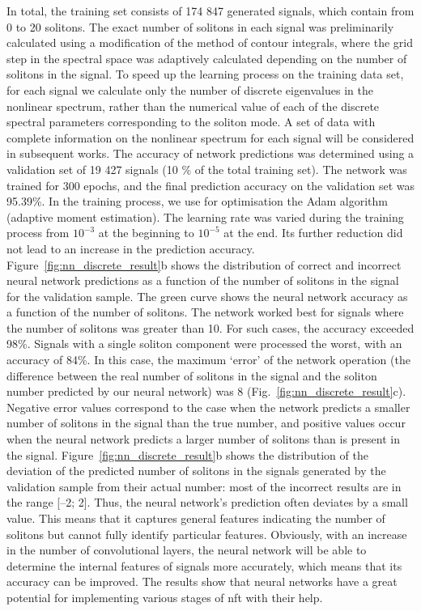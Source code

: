 In total, the training set consists of 174 847 generated signals, which contain from 0 to 20 solitons. The exact number
of solitons in each signal was preliminarily calculated using
a modification of the method of contour integrals,
where the grid step in the spectral space was adaptively calculated depending on the number of solitons in the signal.
To speed up the learning process on the training data set, for
each signal we calculate only the number of discrete eigenvalues in the nonlinear spectrum, rather than the numerical
value of each of the discrete spectral parameters corresponding to the soliton mode. A set of data with complete information on the nonlinear spectrum for each signal will be
considered in subsequent works. The accuracy of network
predictions was determined using a validation set of
19 427 signals (10 \% of the total training set). The network
was trained for 300 epochs, and the final prediction accuracy
on the validation set was 95.39\%. In the training process, we
use for optimisation the Adam algorithm (adaptive moment
estimation). The learning rate was varied during the training
process from $10^{-3}$ at the beginning to $10^{-5}$ at the end. 
Its further reduction did not lead to an increase in the prediction
accuracy.
Figure~\ref{fig:nn_discrete_result}b shows the distribution of correct and incorrect
neural network predictions as a function of the number of
solitons in the signal for the validation sample. The green
curve shows the neural network accuracy as a function of the
number of solitons. The network worked best for signals
where the number of solitons was greater than 10. For such
cases, the accuracy exceeded 98\%. Signals with a single soliton component were processed the worst, with an accuracy of
84\%. In this case, the maximum ‘error’ of the network operation (the difference between the real number of solitons in the
signal and the soliton number predicted by our neural network) was 8 (Fig.~\ref{fig:nn_discrete_result}c). Negative error values correspond to the
case when the network predicts a smaller number of solitons
in the signal than the true number, and positive values occur
when the neural network predicts a larger number of solitons
than is present in the signal. Figure~\ref{fig:nn_discrete_result}b shows the distribution
of the deviation of the predicted number of solitons in the
signals generated by the validation sample from their actual
number: most of the incorrect results are in the range [–2; 2].
Thus, the neural network’s prediction often deviates by a
small value. This means that it captures general features indicating the number of solitons but cannot fully identify particular features. Obviously, with an increase in the number of
convolutional layers, the neural network will be able to determine the internal features of signals more accurately, which
means that its accuracy can be improved. The results show
that neural networks have a great potential for implementing
various stages of \acrshort{nft} with their help.

